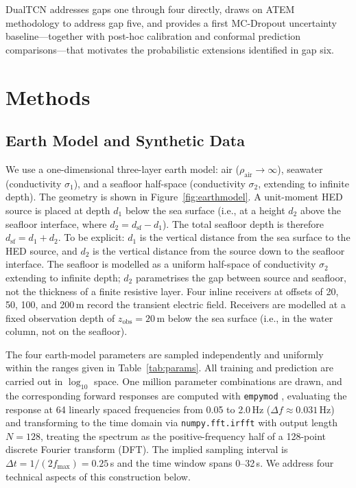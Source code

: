 \documentclass[journal]{IEEEtran}
\begin{document}
DualTCN addresses gaps one through four directly, draws on ATEM
methodology to address gap five, and provides a first MC-Dropout
uncertainty baseline---together with post-hoc calibration and
conformal prediction comparisons---that motivates the probabilistic
extensions identified in gap six.

\section{Methods}
\label{sec:method}

\subsection{Earth Model and Synthetic Data}
\label{sec:params}

We use a one-dimensional three-layer earth model: air
($\rho_\mathrm{air} \to \infty$), seawater (conductivity $\sigma_1$),
and a seafloor half-space (conductivity $\sigma_2$, extending
to infinite depth). The geometry is shown in
Figure~\ref{fig:earthmodel}. A unit-moment HED source is placed at
depth $d_1$ below the sea surface (i.e., at a height $d_2$ above
the seafloor interface, where $d_2 = d_\mathrm{sf} - d_1$). The
total seafloor depth is therefore $d_\mathrm{sf} = d_1 + d_2$.
To be explicit: $d_1$ is the vertical distance from the sea surface
to the HED source, and $d_2$ is the vertical distance from the source
down to the seafloor interface. The seafloor is modelled as a uniform
half-space of conductivity $\sigma_2$ extending to infinite depth;
$d_2$ parametrises the gap between source and seafloor, not the
thickness of a finite resistive layer. Four inline receivers at
offsets of 20, 50, 100, and 200\,m record the transient electric
field. Receivers are modelled at a fixed observation depth of
$z_\mathrm{obs} = 20$\,m below the sea surface (i.e., in the water
column, not on the seafloor).

The four earth-model parameters are sampled independently and
uniformly within the ranges given in Table~\ref{tab:params}. All
training and prediction are carried out in $\log_{10}$ space. One
million parameter combinations are drawn, and the corresponding
forward responses are computed with \texttt{empymod}
\citep{werthmullerEmpymod}, evaluating the response at 64 linearly
spaced frequencies from 0.05 to 2.0\,Hz ($\Delta f \approx 0.031$\,Hz)
and transforming to the time domain via \texttt{numpy.fft.irfft}
\citep{oppenheim1999discrete}
with output length $N = 128$, treating the spectrum as the
positive-frequency half of a 128-point discrete Fourier transform (DFT).  The implied sampling
interval is $\Delta t = 1/(2 f_\mathrm{max}) = 0.25$\,s and the
time window spans 0--32\,s.  We address four technical aspects of
this construction below.
\end{document}
